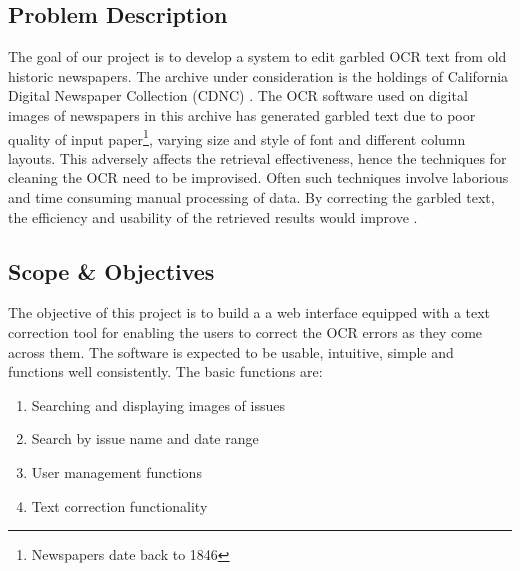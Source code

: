 \documentclass[12pt]{article}
\begin{document}
\subsection{Problem Description}
The goal of our project is to develop a system to edit garbled OCR text from old historic newspapers. The archive under consideration is the holdings of California Digital Newspaper Collection (CDNC) \cite{cdnc}. The OCR software used on digital images of newspapers in this archive has generated garbled text due to poor quality of input paper\footnote{Newspapers date back to 1846}, varying size and style of font and different column layouts. This adversely affects the retrieval effectiveness, hence the techniques for cleaning the OCR \cite{OCR} need to be improvised. Often such techniques involve laborious and time consuming manual processing of data. By correcting the garbled text, the efficiency and usability of the retrieved results would improve . \\

\subsection{Scope \& Objectives}
The objective of this project is to build a a web interface equipped with a text correction tool for enabling the users to correct the OCR errors as they come across them. The software is expected to be usable, intuitive, simple and functions well consistently. 
%
The basic functions are:
\begin{enumerate}
\item Searching and displaying images of issues
\item Search by issue name and date range
\item User management functions
\item Text correction functionality
\end{enumerate}
\end{document}
